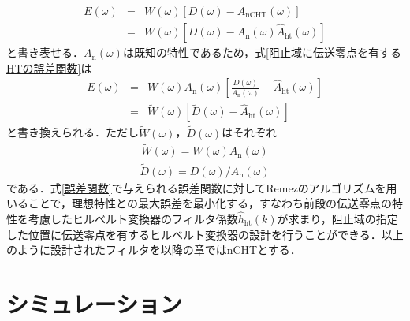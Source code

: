 \documentclass[technicalreport]{ieicej}
\begin{document}
\begin{eqnarray}\label{阻止域に伝送零点を有するHTの誤差関数}
E(\omega)
&=&W(\omega)[D(\omega)-A_{\mathrm{nCHT}}(\omega)]\nonumber\\
&=&W(\omega)[D(\omega)-A_{\mathrm{n}}(\omega)\hat{A}_{\mathrm{ht}}(\omega)]
\end{eqnarray}
と書き表せる．$A_{\mathrm{n}}(\omega)$は既知の特性であるため，式\eqref{阻止域に伝送零点を有するHTの誤差関数}は
\begin{eqnarray}\label{誤差関数}
  E(\omega)
&=&W(\omega)A_{\mathrm{n}}(\omega)\left[{\frac{D(\omega)}{A_{\mathrm{n}}(\omega)}}-\hat{A}_{\mathrm{ht}}(\omega)\right]\nonumber\\
&=&\tilde{W}(\omega)\left[\tilde{D}(\omega)-\hat{A}_{\mathrm{ht}}(\omega)\right]
\end{eqnarray}
と書き換えられる．ただし$\tilde{W}(\omega)$，$\tilde{D}(\omega)$はそれぞれ
\begin{eqnarray}
\tilde{W}(\omega)=W(\omega)A_{\mathrm{n}}(\omega)
\end{eqnarray}
\begin{eqnarray}
\tilde{D}(\omega)={D(\omega)/A_{\mathrm{n}}(\omega)}
\end{eqnarray}
である．式\eqref{誤差関数}で与えられる誤差関数に対してRemezのアルゴリズム\cite{Remez}を用いることで，理想特性との最大誤差を最小化する，すなわち前段の伝送零点の特性を考慮したヒルベルト変換器のフィルタ係数$\hat{h}_{\mathrm{ht}}(k)$が求まり，阻止域の指定した位置に伝送零点を有するヒルベルト変換器の設計を行うことができる．以上のように設計されたフィルタを以降の章ではnCHTとする．
\section{シミュレーション}
\end{document}
